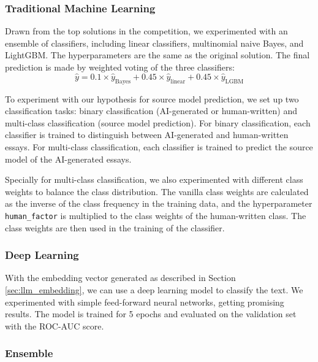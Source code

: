 \documentclass[conference]{IEEEtran}
\begin{document}
\subsubsection{Traditional Machine Learning}
\label{sec:traditional_ml}

Drawn from the top solutions in the competition, we experimented with an ensemble of classifiers, including linear classifiers, multinomial naive Bayes, and LightGBM. The hyperparameters are the same as the original solution. The final prediction is made by weighted voting of the three classifiers:
\begin{equation}
  \hat{y} = 0.1 \times \hat{y}_{\text{Bayes}} + 0.45 \times \hat{y}_{\text{linear}} + 0.45 \times \hat{y}_{\text{LGBM}}
\end{equation}

To experiment with our hypothesis for source model prediction, we set up two classification tasks: binary classification (AI-generated or human-written) and multi-class classification (source model prediction). For binary classification, each classifier is trained to distinguish between AI-generated and human-written essays. For multi-class classification, each classifier is trained to predict the source model of the AI-generated essays.

Specially for multi-class classification, we also experimented with different class weights to balance the class distribution. The vanilla class weights are calculated as the inverse of the class frequency in the training data, and the hyperparameter \texttt{human\_factor} is multiplied to the class weights of the human-written class. The class weights are then used in the training of the classifier.


\subsubsection{Deep Learning}

With the embedding vector generated as described in Section \ref{sec:llm_embedding}, we can use a deep learning model to classify the text. We experimented with simple feed-forward neural networks, getting promising results. The model is trained for 5 epochs and evaluated on the validation set with the ROC-AUC score.

\subsubsection{Ensemble}
\end{document}
